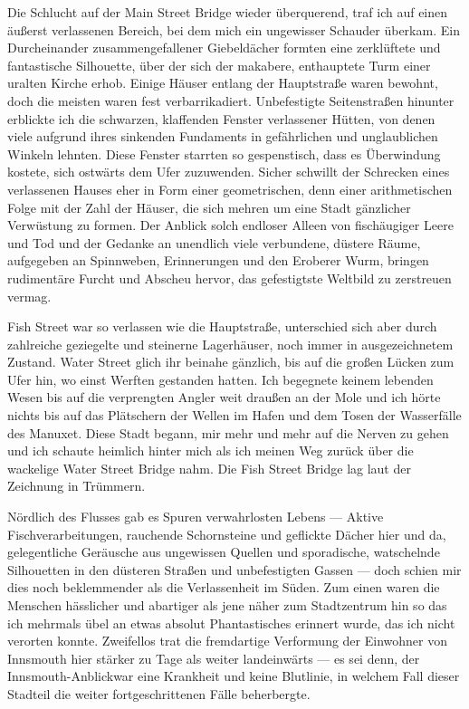 Die Schlucht auf der Main Street Bridge wieder überquerend, traf ich auf einen äußerst verlassenen Bereich, bei dem mich ein ungewisser Schauder überkam. Ein Durcheinander zusammengefallener Giebeldächer formten eine zerklüftete und fantastische Silhouette, über der sich der makabere, enthauptete Turm einer uralten Kirche erhob.  Einige Häuser entlang der Hauptstraße waren bewohnt, doch die meisten waren fest verbarrikadiert. Unbefestigte Seitenstraßen hinunter erblickte ich die schwarzen, klaffenden Fenster verlassener Hütten, von denen viele aufgrund ihres sinkenden Fundaments in gefährlichen und unglaublichen Winkeln lehnten.
Diese Fenster starrten so gespenstisch, dass es Überwindung kostete, sich ostwärts dem Ufer zuzuwenden. Sicher schwillt der Schrecken eines verlassenen Hauses eher in Form einer geometrischen, denn einer arithmetischen Folge mit der Zahl der Häuser, die sich mehren um eine Stadt gänzlicher Verwüstung zu formen. Der Anblick solch endloser Alleen von fischäugiger Leere und Tod und der Gedanke an unendlich viele verbundene, düstere Räume, aufgegeben an Spinnweben, Erinnerungen und den Eroberer Wurm, bringen rudimentäre Furcht und Abscheu hervor, das gefestigtste Weltbild zu zerstreuen vermag.

Fish Street war so verlassen wie die Hauptstraße, unterschied sich aber durch zahlreiche geziegelte und steinerne Lagerhäuser, noch immer in ausgezeichnetem Zustand. Water Street glich ihr beinahe gänzlich, bis auf die großen Lücken zum Ufer hin, wo einst Werften gestanden hatten. Ich begegnete keinem lebenden Wesen bis auf die verprengten Angler weit draußen an der Mole und ich hörte nichts bis auf das Plätschern der Wellen im Hafen und dem Tosen der Wasserfälle des Manuxet. Diese Stadt begann, mir mehr und mehr auf die Nerven zu gehen und ich schaute heimlich hinter mich als ich meinen Weg zurück über die wackelige Water Street Bridge nahm. Die Fish Street Bridge lag laut der Zeichnung in Trümmern.

Nördlich des Flusses gab es Spuren verwahrlosten Lebens --- Aktive Fischverarbeitungen, rauchende Schornsteine und geflickte Dächer hier und da, gelegentliche Geräusche aus ungewissen Quellen und sporadische, watschelnde Silhouetten in den düsteren Straßen und unbefestigten Gassen --- doch schien mir dies noch beklemmender als die Verlassenheit im Süden. Zum einen waren die Menschen hässlicher und abartiger als jene näher zum Stadtzentrum hin so das ich mehrmals übel an etwas
absolut Phantastisches erinnert wurde, das ich nicht verorten konnte. Zweifellos trat die fremdartige Verformung der Einwohner von Innsmouth hier stärker zu Tage als weiter landeinwärts --- es sei denn, der \glqq Innsmouth-Anblick\grqq war eine Krankheit und keine Blutlinie, in welchem Fall dieser Stadteil die weiter fortgeschrittenen Fälle beherbergte.

